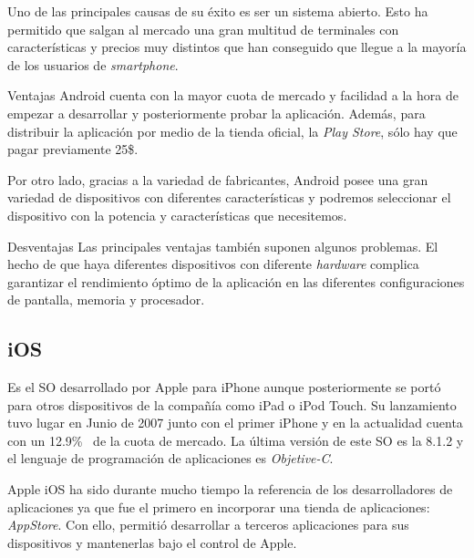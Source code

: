 Uno de las principales causas de su éxito es ser un sistema abierto. Esto ha permitido que salgan al
mercado una gran multitud de terminales con características y precios muy distintos que han
conseguido que llegue a la mayoría de los usuarios de \emph{smartphone}.

\begin{definitionlist}
  \item[Ventajas] Android cuenta con la mayor cuota de mercado y facilidad a la hora de empezar a
    desarrollar y posteriormente probar la aplicación. Además, para distribuir la aplicación por
    medio de la tienda oficial, la \emph{Play Store}, sólo hay que pagar previamente 25\$.

    Por otro lado, gracias a la variedad de fabricantes, Android posee una gran variedad de
    dispositivos con diferentes características y podremos seleccionar el dispositivo con la
    potencia y características que necesitemos.

  \item[Desventajas] Las principales ventajas también suponen algunos problemas. El hecho de que
    haya diferentes dispositivos con diferente \emph{hardware} complica garantizar el rendimiento
    óptimo de la aplicación en las diferentes configuraciones de pantalla, memoria y procesador.

\end{definitionlist}

\subsection{iOS}

Es el \acs{SO} desarrollado por Apple para iPhone aunque posteriormente se portó para otros
dispositivos de la compañía como iPad o iPod Touch. Su lanzamiento tuvo lugar en Junio de 2007 junto
con el primer iPhone y en la actualidad cuenta con un 12.9\%~\cite{Llamas13} de la cuota de
mercado. La última versión de este \acs{SO} es la 8.1.2 y el lenguaje de programación de
aplicaciones es \emph{Objetive-C}.

Apple iOS ha sido durante mucho tiempo la referencia de los desarrolladores de aplicaciones ya que
fue el primero en incorporar una tienda de aplicaciones: \emph{AppStore}. Con ello, permitió
desarrollar a terceros aplicaciones para sus dispositivos y mantenerlas bajo el control de Apple.


